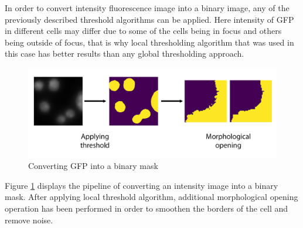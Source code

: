In order to convert intensity fluorescence image into a binary image, any of the previously described threshold algorithms can be applied. Here intensity of GFP in different cells may differ due to some of the cells being in focus and others being outside of focus, that is why local thresholding algorithm that was used in this case has better results than any global thresholding approach.
\begin{figure}[H]
	\begin{center}
		\includegraphics[width=0.5\linewidth]{bilder/gfp/binary-bce/preprocessing/preprocessing-gfp.png}
		\caption{Converting GFP into a binary mask}\label{fig:gfp-binary}
	\end{center}
\end{figure}

Figure \ref{fig:gfp-binary} displays the pipeline of converting an intensity image into a binary mask. After applying local threshold algorithm, additional morphological opening operation has been performed in order to smoothen the borders of the cell and remove noise. 